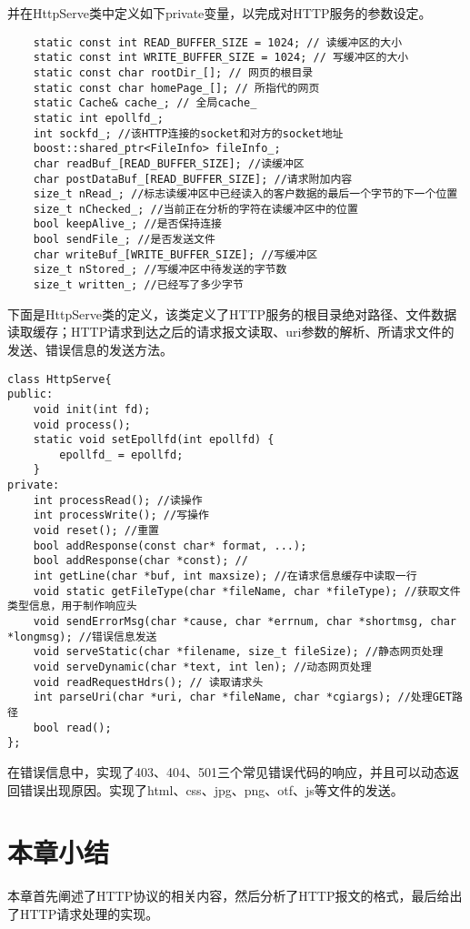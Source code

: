\documentclass[bachelor]{thesis-uestc}
\begin{document}
并在HttpServe类中定义如下private变量，以完成对HTTP服务的参数设定。
\begin{lstlisting}
	static const int READ_BUFFER_SIZE = 1024; // 读缓冲区的大小
	static const int WRITE_BUFFER_SIZE = 1024; // 写缓冲区的大小
	static const char rootDir_[]; // 网页的根目录
	static const char homePage_[]; // 所指代的网页
	static Cache& cache_; // 全局cache_
	static int epollfd_;
	int sockfd_; //该HTTP连接的socket和对方的socket地址
	boost::shared_ptr<FileInfo> fileInfo_;
	char readBuf_[READ_BUFFER_SIZE]; //读缓冲区
	char postDataBuf_[READ_BUFFER_SIZE]; //请求附加内容
	size_t nRead_; //标志读缓冲区中已经读入的客户数据的最后一个字节的下一个位置
	size_t nChecked_; //当前正在分析的字符在读缓冲区中的位置
	bool keepAlive_; //是否保持连接
	bool sendFile_; //是否发送文件
	char writeBuf_[WRITE_BUFFER_SIZE]; //写缓冲区
	size_t nStored_; //写缓冲区中待发送的字节数
	size_t written_; //已经写了多少字节
\end{lstlisting}

下面是HttpServe类的定义，该类定义了HTTP服务的根目录绝对路径、文件数据读取缓存；HTTP请求到达之后的请求报文读取、uri参数的解析、所请求文件的发送、错误信息的发送方法。
\begin{lstlisting}
class HttpServe{
public:
	void init(int fd);
	void process();
	static void setEpollfd(int epollfd) {
		epollfd_ = epollfd;
	}
private:
	int processRead(); //读操作
	int processWrite(); //写操作
	void reset(); //重置
	bool addResponse(const char* format, ...); 
	bool addResponse(char *const); //
	int getLine(char *buf, int maxsize); //在请求信息缓存中读取一行
	void static getFileType(char *fileName, char *fileType); //获取文件类型信息，用于制作响应头
	void sendErrorMsg(char *cause, char *errnum, char *shortmsg, char *longmsg); //错误信息发送
	void serveStatic(char *filename, size_t fileSize); //静态网页处理
	void serveDynamic(char *text, int len); //动态网页处理
	void readRequestHdrs(); // 读取请求头
	int parseUri(char *uri, char *fileName, char *cgiargs); //处理GET路径
	bool read();
};
\end{lstlisting}

在错误信息中，实现了403、404、501三个常见错误代码的响应，并且可以动态返回错误出现原因。实现了html、css、jpg、png、otf、js等文件的发送。

\section{本章小结}
本章首先阐述了HTTP协议的相关内容，然后分析了HTTP报文的格式，最后给出了HTTP请求处理的实现。
\end{document}
